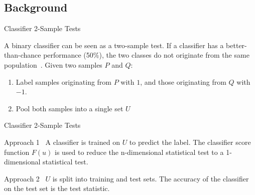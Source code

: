 \documentclass[10pt,notes]{beamer}
\begin{document}
\subsection{Background}

\begin{frame}{Classifier 2-Sample Tests}
    \begin{block}{}
        A binary classifier can be seen as a two-sample test.
        If a classifier has a better-than-chance performance (50\%), the two classes do not originate from the same
        population~\cite{friedman2004multivariate}.
        \smallskip
        Given two samples $P$ and $Q$:
        \begin{enumerate}
            \item Label samples originating from $P$ with $1$, and those originating from $Q$ with $-1$.
            \item Pool both samples into a single set $U$
        \end{enumerate}
    \end{block}
\end{frame}

\begin{frame}{Classifier 2-Sample Tests}
    \begin{block}{Approach 1~\cite{friedman2004multivariate}}
        A classifier is trained on $U$ to predict the label. The classifier score function $F(u)$ is used
        to reduce the n-dimensional statistical test to a 1-dimensional statistical test.
    \end{block}
    \begin{block}{Approach 2~\cite{lopez2016revisiting}}
        $U$ is split into training and test sets. The accuracy of the classifier on the test set is the test statistic.
    \end{block}

\end{frame}
\end{document}
